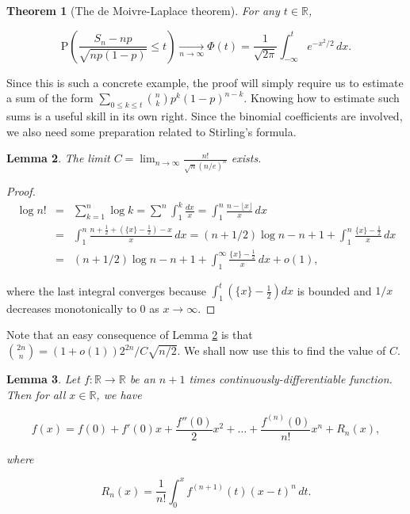 \documentclass[11pt]{report}
\newcommand{\R}{\mathbb{R}}
\theoremstyle{plain}
\newtheorem{thm}{Theorem}[chapter]
\newtheorem{lem}[thm]{Lemma}
\theoremstyle{definition}
\begin{document}
\begin{thm}[The de Moivre-Laplace theorem]
\label{thm-demoivre-laplace}
For any $t\in \R$,

\[
\mathrm{P}
\left(\frac{S_n - n p}{\sqrt{n p(1-p)}} \le t \right) \xrightarrow[n\to\infty]{} \Phi(t) = \frac{1}{\sqrt{2\pi}}
\int_{-\infty}^t e^{-x^2/2}\,dx.
\]

\end{thm}

Since this is such a concrete example, the proof will
simply require us to estimate a sum of the form
$\sum_{0\le k\le t} \binom{n}{k} p^k (1-p)^{n-k}$.
Knowing how to estimate such sums is a useful skill in
its own right. Since the binomial coefficients are
involved, we also need some preparation related to
Stirling's formula.

\begin{lem}
\label{lem-prestirling}
The limit
$C = \lim_{n\to\infty} \frac{n!}{\sqrt{n} (n/e)^n}$
exists.
\end{lem}

\begin{proof}

\begin{eqnarray*}
\log n! &=& \sum_{k=1}^n \log k = \sum_{}^n \int_1^k \frac{dx}{x} = \int_1^n \frac{n-\lfloor x\rfloor}{x}\,dx \\
&=& \int_1^n \frac{n+\frac12 + (\{ x\}-\frac12)-x}{x}\, dx = (n+1/2)\log n - n + 1 + \int_1^n \frac{\{x\}-\frac12}{x}\,dx \\
&=& (n+1/2)\log n - n + 1 + \int_1^\infty \frac{\{x\}-\frac12}{x}\,dx + o(1),
\end{eqnarray*}

where the last integral converges because
$\int_1^t (\{x\}-\frac12) dx$ is bounded and $1/x$
decreases monotonically to 0 as $x\to\infty$.
\end{proof}

Note that an easy consequence of Lemma
\ref{lem-prestirling} is that
$\binom{2n}{n} = (1+o(1))2^{2n}/C\sqrt{n/2}$. We
shall now use this to find the value of $C$.

\begin{lem}
\label{lem-prevlemma}
Let $f:\R\to\R$ be an $n+1$ times
continuously-differentiable function. Then for all
$x\in\R$, we have

\[
f(x) = f(0) + f'(0)x + \frac{f''(0)}{2}x^2 + \ldots + \frac{f^{(n)}(0)}{n!} x^n + R_n(x),
\]

where

\[
R_n(x) = \frac{1}{n!} \int_0^x f^{(n+1)}(t)(x-t)^n\,dt.
\]

\end{lem}
\end{document}
